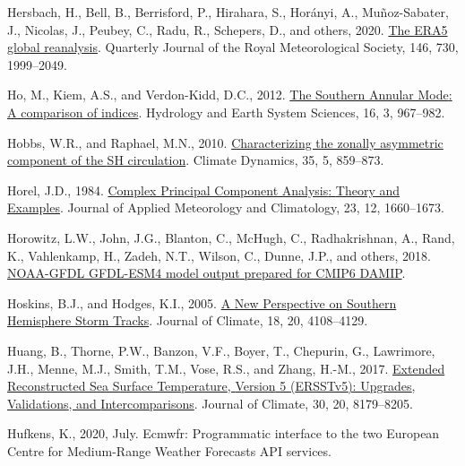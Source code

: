 \documentclass[12pt,oneside]{reedthesis}
\newlength{\cslhangindent}
\newenvironment{CSLReferences}[2] %
 {%
  \setlength{\parindent}{0pt}
  \ifodd #1 \everypar{\setlength{\hangindent}{\cslhangindent}}\ignorespaces\fi
  \ifnum #2 > 0
  \setlength{\parskip}{#2\baselineskip}
  \fi
 }%
 {}
\begin{document}
\begin{CSLReferences}{1}{0}
\leavevmode{}%
Hersbach, H., Bell, B., Berrisford, P., Hirahara, S., Horányi, A., Muñoz-Sabater, J., Nicolas, J., Peubey, C., Radu, R., Schepers, D., and others, 2020. \href{https://doi.org/10.1002/qj.3803}{The {ERA5} global reanalysis}. Quarterly Journal of the Royal Meteorological Society, 146, 730, 1999--2049.

\leavevmode{}%
Ho, M., Kiem, A.S., and Verdon-Kidd, D.C., 2012. \href{https://doi.org/10.5194/hess-16-967-2012}{The {Southern Annular Mode}: A comparison of indices}. Hydrology and Earth System Sciences, 16, 3, 967--982.

\leavevmode{}%
Hobbs, W.R., and Raphael, M.N., 2010. \href{https://doi.org/10.1007/s00382-009-0663-z}{Characterizing the zonally asymmetric component of the {SH} circulation}. Climate Dynamics, 35, 5, 859--873.

\leavevmode{}%
Horel, J.D., 1984. \href{https://doi.org/10.1175/1520-0450(1984)023\%3C1660:CPCATA\%3E2.0.CO;2}{Complex {Principal Component Analysis}: {Theory} and {Examples}}. Journal of Applied Meteorology and Climatology, 23, 12, 1660--1673.

\leavevmode{}%
Horowitz, L.W., John, J.G., Blanton, C., McHugh, C., Radhakrishnan, A., Rand, K., Vahlenkamp, H., Zadeh, N.T., Wilson, C., Dunne, J.P., and others, 2018. \href{https://doi.org/10.22033/ESGF/CMIP6.1408}{NOAA-GFDL GFDL-ESM4 model output prepared for CMIP6 DAMIP}.

\leavevmode{}%
Hoskins, B.J., and Hodges, K.I., 2005. \href{https://doi.org/10.1175/JCLI3570.1}{A {New Perspective} on {Southern Hemisphere Storm Tracks}}. Journal of Climate, 18, 20, 4108--4129.

\leavevmode{}%
Huang, B., Thorne, P.W., Banzon, V.F., Boyer, T., Chepurin, G., Lawrimore, J.H., Menne, M.J., Smith, T.M., Vose, R.S., and Zhang, H.-M., 2017. \href{https://doi.org/10.1175/JCLI-D-16-0836.1}{Extended {Reconstructed Sea Surface Temperature}, {Version} 5 ({ERSSTv5}): {Upgrades}, {Validations}, and {Intercomparisons}}. Journal of Climate, 30, 20, 8179--8205.

\leavevmode{}%
Hufkens, K., 2020, July. Ecmwfr: {Programmatic} interface to the two {European Centre} for {Medium-Range Weather Forecasts API} services.


\end{CSLReferences}
\end{document}
